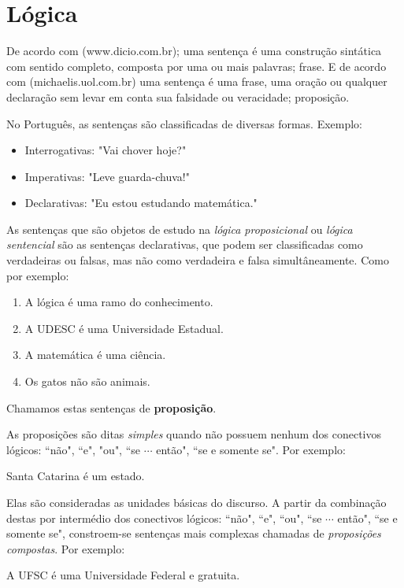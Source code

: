 \chapter{Lógica}

De acordo com (www.dicio.com.br); uma sentença é uma construção sintática com sentido completo, composta por uma ou mais palavras; frase. E de acordo com (michaelis.uol.com.br) uma sentença é uma frase, uma oração ou qualquer declaração sem levar em conta sua falsidade ou veracidade; proposição.

No Português, as sentenças são classificadas de diversas formas. Exemplo:
\begin{itemize}
 \item Interrogativas: "Vai chover hoje?"
 \item Imperativas: "Leve guarda-chuva!"
 \item Declarativas: "Eu estou estudando matemática."
\end{itemize}

As sentenças que são objetos de estudo na \emph{lógica proposicional} ou \emph{lógica sentencial} são as sentenças declarativas, que podem ser classificadas como verdadeiras ou falsas, mas não como verdadeira e falsa simultâneamente. Como por exemplo:

\begin{enumerate}
 \item A lógica é uma ramo do conhecimento.
 \item A UDESC é uma Universidade Estadual.
 \item A matemática é uma ciência.
 \item Os gatos não são animais.
\end{enumerate}


Chamamos estas sentenças de \textbf{proposição}. 

As proposições são ditas \emph{simples} quando não possuem nenhum dos conectivos lógicos: ``não", ``e", "ou", ``se $\cdots$ então", ``se e somente se". Por exemplo:
\begin{center}
Santa Catarina é um estado.
\end{center}
Elas são consideradas as unidades básicas do discurso. A partir da combinação destas por intermédio dos conectivos lógicos: ``não", ``e", ``ou", ``se $\cdots$ então", ``se e somente se", constroem-se sentenças mais complexas chamadas de \emph{proposições compostas}. Por exemplo:
\begin{center}
A UFSC é uma Universidade Federal e gratuita.
\end{center}

